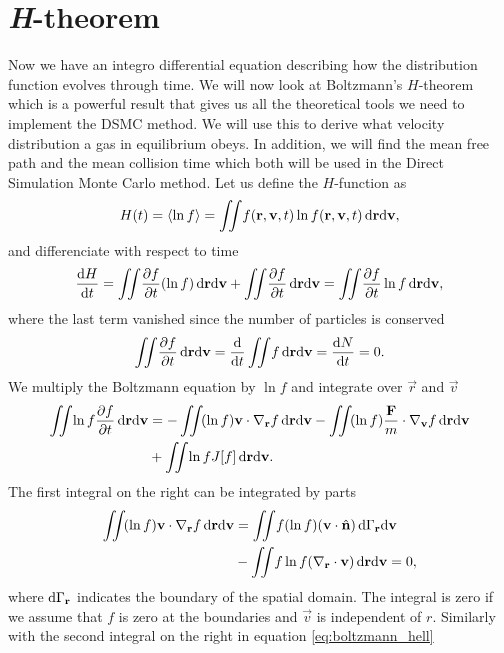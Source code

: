 \section{\textit{H}-theorem}
Now we have an integro differential equation describing how the distribution function evolves through time. We will now look at Boltzmann's $H$-theorem which is a powerful result that gives us all the theoretical tools we need to implement the DSMC method. We will use this to derive what velocity distribution a gas in equilibrium obeys. In addition, we will find the mean free path and the mean collision time which both will be used in the Direct Simulation Monte Carlo method. Let us define the $H$-function as
\begin{align}
	\label{eq:h_function}
	H(t) = \langle \ln f \rangle = \iint\! f(\mathbf r, \mathbf v, t)\ln f(\mathbf r, \mathbf v, t)\,\mathrm{d}\mathbf r \mathrm{d}\mathbf v,
\end{align}
and differenciate with respect to time
\begin{align}
	\label{eq:h_theorem_one}
	\frac{\mathrm{d}H}{\mathrm{d}t} = \iint\! \frac{\partial f}{\partial t}(\ln f) \,\mathrm{d}\mathbf r \mathrm{d}\mathbf v + \iint\! \frac{\partial f}{\partial t} \,\mathrm{d}\mathbf r \mathrm{d}\mathbf v = \iint\! \frac{\partial f}{\partial t}\ln f \,\mathrm{d}\mathbf r \mathrm{d}\mathbf v,
\end{align}
where the last term vanished since the number of particles is conserved
\begin{align}
	\iint\! \dpart{f}{t} \,\dm\vec r \dm\vec v = \frac{\dm}{\dm t} \iint\! f \,\dm\vec r \dm\vec v = \frac{\dm N}{\dm t} = 0.
\end{align}
We multiply the Boltzmann equation by $\ln f$ and integrate over $\vec r$ and $\vec v$
\begin{align}
	\nonumber
	\iint\! \ln f\frac{\partial f}{\partial t} \,\mathrm{d}\mathbf r \mathrm{d}\mathbf v &= -\iint\! (\ln f)\mathbf v\cdot \nabla_\mathbf r f \,\mathrm{d}\mathbf r \mathrm{d}\mathbf v - \iint\! (\ln f) \frac{\mathbf F}{m}\cdot \nabla_\mathbf v f \,\mathrm{d}\mathbf r\mathrm{d}\mathbf v\\
	\label{eq:boltzmann_hell}
	&+ \iint\! \ln f J[f] \,\mathrm{d}\mathbf r \mathrm{d}\mathbf v.
\end{align}
The first integral on the right can be integrated by parts
\begin{align}
	\nonumber
	\iint\! (\ln f)\mathbf v\cdot \nabla_\mathbf r f \,\mathrm{d}\mathbf r \mathrm{d}\mathbf v &= \iint\! f(\ln f) (\mathbf v\cdot \hat{\mathbf n}) \,\mathrm{d}\Gamma_\mathbf r\mathrm{d}\mathbf v\\
	&- \iint\! f\ln f(\nabla_\mathbf r \cdot \mathbf v)\,\mathrm{d}\mathbf r\mathrm{d}\mathbf v = 0,
\end{align}
where $\mathrm{d}\Gamma_\mathbf r$ indicates the boundary of the spatial domain. The integral is zero if we assume that $f$ is zero at the boundaries and $\vec v$ is independent of $r$. Similarly with the second integral on the right in equation \eqref{eq:boltzmann_hell}
